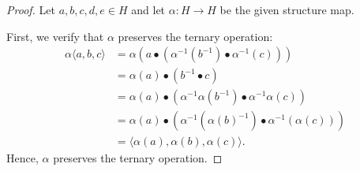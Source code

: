 \documentclass[14pt]{article}
\theoremstyle{Definition}
\theoremstyle{remark}
\begin{document}
\begin{proof}
Let $a, b, c, d, e \in H$ and let $\alpha : H \to H$ be the given structure map.  

First, we verify that $\alpha$ preserves the ternary operation:
\begin{align*}
\alpha\langle a, b, c\rangle 
&= \alpha(a \bullet(\alpha^{-1}( b^{-1}) \bullet\alpha^{-1}( c))) \\
&= \alpha(a) \bullet(b^{-1} \bullet c) \\
&= \alpha(a) \bullet(\alpha^{-1} \alpha(b^{-1}) \bullet\alpha^{-1} \alpha(c)) \\
&=\alpha(a) \bullet(\alpha^{-1} (\alpha(b)^{-1}) \bullet\alpha^{-1}( \alpha(c)))\\
&=\langle \alpha(a),\alpha(b),\alpha(c)\rangle.
\end{align*}
Hence, $\alpha$ preserves the ternary operation.


\end{proof}
\end{document}
